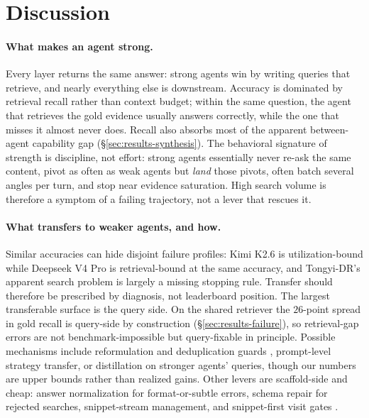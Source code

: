 \section{Discussion}
\label{sec:discussion}

\paragraph{What makes an agent strong.} Every layer returns the same answer: strong agents win by writing queries that retrieve, and nearly everything else is downstream. Accuracy is dominated by retrieval recall rather than context budget; within the same question, the agent that retrieves the gold evidence usually answers correctly, while the one that misses it almost never does. Recall also absorbs most of the apparent between-agent capability gap (§\ref{sec:results-synthesis}). The behavioral signature of strength is discipline, not effort: strong agents essentially never re-ask the same content, pivot as often as weak agents but \emph{land} those pivots, often batch several angles per turn, and stop near evidence saturation. High search volume is therefore a symptom of a failing trajectory, not a lever that rescues it.

\paragraph{What transfers to weaker agents, and how.} Similar accuracies can hide disjoint failure profiles: Kimi K2.6 is utilization-bound while Deepseek V4 Pro is retrieval-bound at the same accuracy, and Tongyi-DR's apparent search problem is largely a missing stopping rule. Transfer should therefore be prescribed by diagnosis, not leaderboard position. The largest transferable surface is the query side. On the shared retriever the $26$-point spread in gold recall is query-side by construction (§\ref{sec:results-failure}), so retrieval-gap errors are not benchmark-impossible but query-fixable in principle. Possible mechanisms include reformulation and deduplication guards \citep{huang2009analyzing}, prompt-level strategy transfer, or distillation on stronger agents' queries, though our numbers are upper bounds rather than realized gains. Other levers are scaffold-side and cheap: answer normalization for format-or-subtle errors, schema repair for rejected searches, snippet-stream management, and snippet-first visit gates \citep{Chen2026AgentIRReasoning-AwareRetrieval}.

